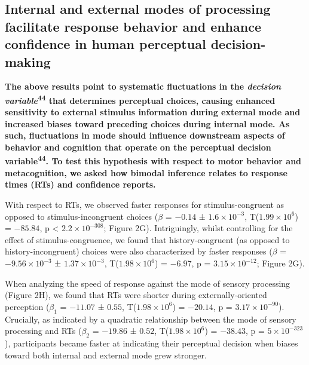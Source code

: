 \documentclass[
]{article}
\begin{document}
\hypertarget{internal-and-external-modes-of-processing-facilitate-response-behavior-and-enhance-confidence-in-human-perceptual-decision-making}{%
\subsection{Internal and external modes of processing facilitate
response behavior and enhance confidence in human perceptual
decision-making}\label{internal-and-external-modes-of-processing-facilitate-response-behavior-and-enhance-confidence-in-human-perceptual-decision-making}}

\textbf{The above results point to systematic fluctuations in the
\emph{decision variable}\textsuperscript{44} that determines perceptual
choices, causing enhanced sensitivity to external stimulus information
during external mode and increased biases toward preceding choices
during internal mode. As such, fluctuations in mode should influence
downstream aspects of behavior and cognition that operate on the
perceptual decision variable\textsuperscript{44}. To test this
hypothesis with respect to motor behavior and metacognition, we asked
how bimodal inference relates to response times (RTs) and confidence
reports.}

With respect to RTs, we observed faster responses for stimulus-congruent
as opposed to stimulus-incongruent choices (\(\beta\) = \(-0.14\) ±
\(\ensuremath{1.6\times 10^{-3}}\),
T(\(\ensuremath{1.99\times 10^{6}}\)) = \(-85.84\), p < \(\ensuremath{2.2\times 10^{-308}}\); Figure
2G). Intriguingly, whilst controlling for the effect of
stimulus-congruence, we found that history-congruent (as opposed to
history-incongruent) choices were also characterized by faster responses
(\(\beta\) = \(\ensuremath{-9.56\times 10^{-3}}\) ±
\(\ensuremath{1.37\times 10^{-3}}\),
T(\(\ensuremath{1.98\times 10^{6}}\)) = \(-6.97\), p =
\(\ensuremath{3.15\times 10^{-12}}\); Figure 2G).

When analyzing the speed of response against the mode of sensory
processing (Figure 2H), we found that RTs were shorter during
externally-oriented perception (\(\beta_1\) = \(-11.07\) ± \(0.55\),
T(\(\ensuremath{1.98\times 10^{6}}\)) = \(-20.14\), p =
\(\ensuremath{3.17\times 10^{-90}}\)). Crucially, as indicated by a
quadratic relationship between the mode of sensory processing and RTs
(\(\beta_2\) = \(-19.86\) ± \(0.52\),
T(\(\ensuremath{1.98\times 10^{6}}\)) = \(-38.43\), p =
\(\ensuremath{5\times 10^{-323}}\)), participants became faster at
indicating their perceptual decision when biases toward both internal
and external mode grew stronger.
\end{document}
